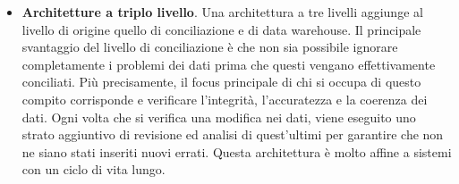 \begin{itemize}
\begin{enumerate}
            \item La \textit{profilazione dei dati}\footnote{La \textit{profilazione dei dati} è il processo di esame dei dati disponibili da una fonte di informazioni esistente e la raccolta di statistiche o riepiloghi formativi su tali dati.\cite{wikipedia_data_profiling}} è l'ultimo livello poiché si occupa di convalidare l'integrità dei dati e gli standard di una possibile presentazione. Esso comprende anche analisi avanzate come la generazione di rapporti in tempo reale e batch e le visualizzazioni.
        \end{enumerate}
    \item \textbf{Architetture a triplo livello}. Una architettura a tre livelli aggiunge al livello di origine quello di conciliazione e di data warehouse. Il principale svantaggio del livello di conciliazione è che non sia possibile ignorare completamente i problemi dei dati prima che questi vengano effettivamente conciliati. Più precisamente, il focus principale di chi si occupa di questo compito corrisponde e verificare l'integrità, l'accuratezza e la coerenza dei dati. Ogni volta che si verifica una modifica nei dati, viene eseguito uno strato aggiuntivo di revisione ed analisi di quest'ultimi per garantire che non ne siano stati inseriti nuovi errati. Questa architettura è molto affine a sistemi con un ciclo di vita lungo.
\end{itemize}

